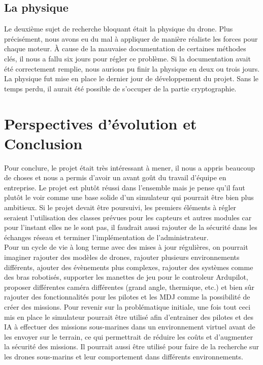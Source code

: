\documentclass{scrartcl}
\begin{document}
\subsection{La physique}
Le deuxième sujet de recherche bloquant était la physique du drone.
Plus précisément, nous avons eu du mal à appliquer de manière réaliste les forces pour chaque moteur.
À cause de la mauvaise documentation de certaines méthodes clés, il nous a fallu six jours pour régler ce problème.
Si la documentation avait été correctement remplie, nous aurions pu finir la physique en deux ou trois jours.
La physique fut mise en place le dernier jour de développement du projet.
Sans le temps perdu, il aurait été possible de s'occuper de la partie cryptographie.


\section{Perspectives d'évolution et Conclusion}
\label{sec:perspectives}


Pour conclure, le projet était très intéressant à mener, il nous a appris beaucoup de choses et nous a permis d'avoir un avant
goût du travail d'équipe en entreprise. Le projet est plutôt réussi dans l'ensemble mais je pense qu'il faut plutôt le voir comme une base solide
d'un simulateur qui pourrait être bien plus ambitieux. Si le projet devait être poursuivi, les premiers éléments à régler seraient
l'utilisation des classes prévues pour les capteurs et autres modules car pour l'instant elles ne le sont pas, il faudrait aussi
rajouter de la sécurité dans les échanges réseau et terminer l'implémentation de l'administrateur.\\
Pour un cycle de vie à long terme avec des mises à jour régulières, on pourrait imaginer rajouter des modèles de drones,
rajouter plusieurs environnements différents, ajouter des évènements plus complexes, rajouter des systèmes comme des bras robotisés,
supporter les manettes de jeu pour le controleur Ardupilot, proposer différentes caméra différentes (grand angle, thermique, etc.) et bien sûr
rajouter des fonctionnalités pour les pilotes et les MDJ comme la possibilité de créer des missions.
Pour revenir sur la problématique initiale, une fois tout ceci mis en place le simulateur pourrait être utilisé afin d'entrainer des pilotes et des IA à effectuer
des missions sous-marines dans un environnement virtuel avant de les envoyer sur le terrain, ce qui permettrait de réduire les coûts et
d'augmenter la sécurité des missions. Il pourrait aussi être utilisé pour faire de la recherche sur les drones sous-marins et leur comportement dans différents environnements.
\end{document}
